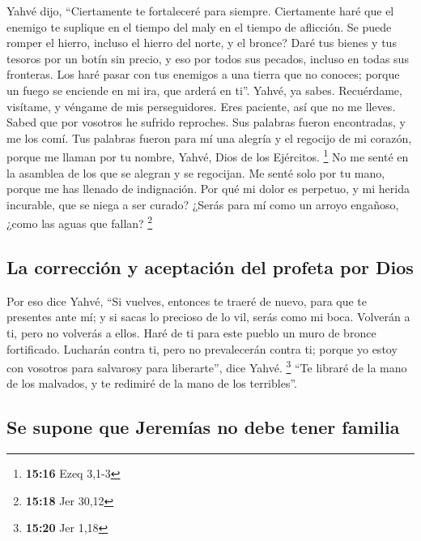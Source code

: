  Yahvé dijo, ``Ciertamente te fortaleceré para siempre.
Ciertamente haré que el enemigo te suplique en el tiempo del maly en el
tiempo de aflicción.  Se puede romper el hierro, incluso
el hierro del norte, y el bronce?  Daré tus bienes y tus
tesoros por un botín sin precio, y eso por todos sus pecados, incluso en
todas sus fronteras.  Los haré pasar con tus enemigos a
una tierra que no conoces; porque un fuego se enciende en mi ira, que
arderá en ti''.  Yahvé, ya sabes. Recuérdame, visítame, y
véngame de mis perseguidores. Eres paciente, así que no me lleves. Sabed
que por vosotros he sufrido reproches.  Sus palabras
fueron encontradas, y me los comí. Tus palabras fueron para mí una
alegría y el regocijo de mi corazón, porque me llaman por tu nombre,
Yahvé, Dios de los Ejércitos. \footnote{\textbf{15:16} Ezeq 3,1-3}
 No me senté en la asamblea de los que se alegran y se
regocijan. Me senté solo por tu mano, porque me has llenado de
indignación.  Por qué mi dolor es perpetuo, y mi herida
incurable, que se niega a ser curado? ¿Serás para mí como un arroyo
engañoso, ¿como las aguas que fallan? \footnote{\textbf{15:18} Jer 30,12}

\hypertarget{la-correcciuxf3n-y-aceptaciuxf3n-del-profeta-por-dios}{%
\subsection{La corrección y aceptación del profeta por
Dios}\label{la-correcciuxf3n-y-aceptaciuxf3n-del-profeta-por-dios}}

 Por eso dice Yahvé, ``Si vuelves, entonces te traeré de
nuevo, para que te presentes ante mí; y si sacas lo precioso de lo vil,
serás como mi boca. Volverán a ti, pero no volverás a ellos.
 Haré de ti para este pueblo un muro de bronce
fortificado. Lucharán contra ti, pero no prevalecerán contra ti; porque
yo estoy con vosotros para salvarosy para liberarte'', dice Yahvé.
\footnote{\textbf{15:20} Jer 1,18}  ``Te libraré de la
mano de los malvados, y te redimiré de la mano de los terribles''.

\hypertarget{se-supone-que-jeremuxedas-no-debe-tener-familia}{%
\subsection{Se supone que Jeremías no debe tener
familia}\label{se-supone-que-jeremuxedas-no-debe-tener-familia}}

